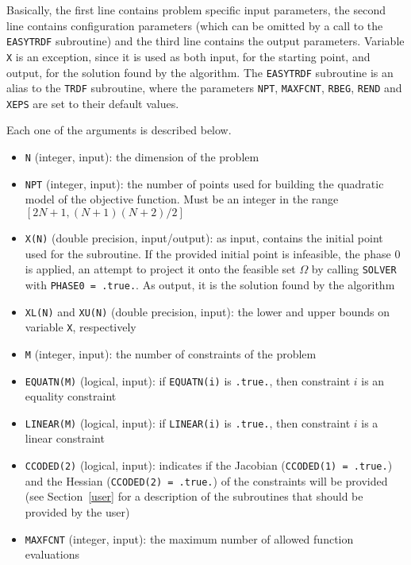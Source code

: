 \documentclass[12pt]{article}
\begin{document}
Basically, the first line contains problem specific input parameters,
the second line contains configuration parameters (which can be
omitted by a call to the \texttt{EASYTRDF} subroutine) and the third
line contains the output parameters. Variable \texttt{X} is an
exception, since it is used as both input, for the starting point, and
output, for the solution found by the algorithm. The \texttt{EASYTRDF}
subroutine is an alias to the \texttt{TRDF} subroutine, where the
parameters \texttt{NPT}, \texttt{MAXFCNT}, \texttt{RBEG},
\texttt{REND} and \texttt{XEPS} are set to their default values.

Each one of the arguments is described below.

\begin{itemize}
\item \texttt{N} (integer, input): the dimension of the problem
\item \texttt{NPT} (integer, input): the number of points used for
  building the quadratic model of the objective function. Must be an
  integer in the range $[2N + 1,(N + 1)(N + 2) / 2]$
\item \texttt{X(N)} (double precision, input/output): as input,
  contains the initial point used for the subroutine. If the provided
  initial point is infeasible, the phase 0 is applied, an attempt to
  project it onto the feasible set $\Omega$ by calling \texttt{SOLVER}
  with \texttt{PHASE0 = .true.}. As output, it is the solution found
  by the algorithm
\item \texttt{XL(N)} and \texttt{XU(N)} (double precision, input): the
  lower and upper bounds on variable \texttt{X}, respectively
\item \texttt{M} (integer, input): the number of constraints of the problem
\item \texttt{EQUATN(M)} (logical, input): if \texttt{EQUATN(i)} is
  \texttt{.true.}, then constraint $i$ is an equality constraint
\item \texttt{LINEAR(M)} (logical, input): if \texttt{LINEAR(i)} is
  \texttt{.true.}, then constraint $i$ is a linear constraint
\item \texttt{CCODED(2)} (logical, input): indicates if the Jacobian
  (\texttt{CCODED(1) = .true.}) and the Hessian (\texttt{CCODED(2) =
    .true.}) of the constraints will be provided (see
  Section~\ref{user} for a description of the subroutines that should
  be provided by the user)
\item \texttt{MAXFCNT} (integer, input): the maximum number of allowed
  function evaluations

\end{itemize}
\end{document}
